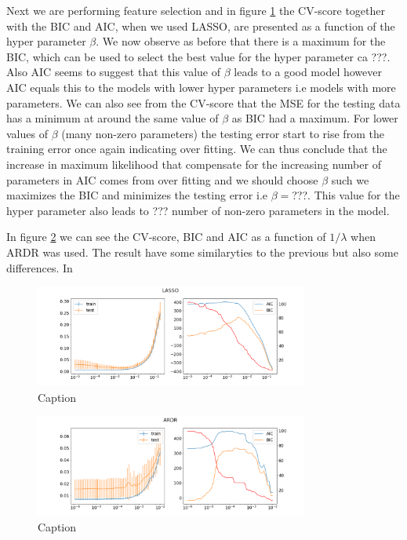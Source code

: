 \documentclass[11pt,a4paper]{article}
\begin{document}
Next we are performing feature selection and in figure \ref{fig:Lasso_scan} the CV-score together with the BIC and AIC, when we used LASSO, are presented as a function of the hyper parameter $\beta$. We now observe as before that there is a maximum for the BIC, which can be used to select the best value for the hyper parameter ca ???. Also AIC seems to suggest that this value of $\beta$ leads to a good model however AIC equals this to the models with lower hyper parameters i.e models with more parameters. We can also see from the CV-score that the MSE for the testing data has a minimum at around the same value of $\beta$ as BIC had a maximum. For lower values of $\beta$ (many non-zero parameters) the testing error start to rise from the training error once again indicating over fitting. We can thus conclude that the increase in maximum likelihood that compensate for the increasing number of parameters in AIC comes from over fitting and we should choose $\beta$ such we maximizes the BIC and minimizes the testing error i.e $\beta = $???. This value for the hyper parameter also leads to $ $??? number of non-zero parameters in the model. 

In figure \ref{fig:ARDR_scan} we can see the CV-score, BIC and AIC as a function of $1/\lambda$ when ARDR was used. The result have some similaryties to the previous but also some differences. In
\begin{figure}[H]
    \centering
    \includegraphics[width = 0.8\textwidth]{figures/LASSO_scan.png}
    \caption{Caption}
    \label{fig:Lasso_scan}
\end{figure}

\begin{figure}[H]
    \centering
    \includegraphics[width = 0.8\textwidth]{figures/ARDR_scan.png}
    \caption{Caption}
    \label{fig:ARDR_scan}
\end{figure}
\end{document}
